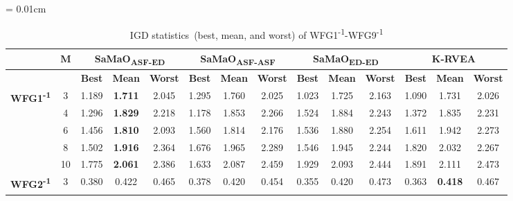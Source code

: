 \documentclass[onecolumn,10pt]{asme2ej}
\begin{document}
\begin{table}[!htb]\scriptsize
	\centering
	\caption{IGD statistics~(best, mean, and worst) of WFG1\textsuperscript{-1}-WFG9\textsuperscript{-1}}
	\label{tab:KHTTab:8}
	\tabcolsep = 0.01cm
	\begin{tabular}{|c|c|c|c|c|c|c|c|c|c|c|c|c|c|}
		\hline
		\textbf{}                                    & \textbf{M} & \multicolumn{3}{c|}{\textbf{SaMaO\textsubscript{ASF-ED}}}      & \multicolumn{3}{c|}{\textbf{SaMaO\textsubscript{ASF-ASF}}}      & \multicolumn{3}{c|}{\textbf{SaMaO\textsubscript{ED-ED}}}       & \multicolumn{3}{c|}{\textbf{K-RVEA}}            \\ \hline
		& \textbf{}  & \textbf{Best} & \textbf{Mean}  & \textbf{Worst} & \textbf{Best} & \textbf{Mean}   & \textbf{Worst} & \textbf{Best} & \textbf{Mean}  & \textbf{Worst} & \textbf{Best} & \textbf{Mean}  & \textbf{Worst} \\ \hline
		\multirow{5}{*}{\textbf{WFG1\textsuperscript{-1}}} & 3          & 1.189         & \textbf{1.711} & 2.045          & 1.295         & 1.760           & 2.025          & 1.023         & 1.725          & 2.163          & 1.090         & 1.731          & 2.026          \\ \cline{2-14} 
		& 4          & 1.296         & \textbf{1.829} & 2.218          & 1.178         & 1.853           & 2.266          & 1.524         & 1.884          & 2.243          & 1.372         & 1.835          & 2.231          \\ \cline{2-14} 
		& 6          & 1.456         & \textbf{1.810} & 2.093          & 1.560         & 1.814           & 2.176          & 1.536         & 1.880          & 2.254          & 1.611         & 1.942          & 2.273          \\ \cline{2-14} 
		& 8          & 1.502         & \textbf{1.916} & 2.364          & 1.676         & 1.965           & 2.289          & 1.546         & 1.945          & 2.244          & 1.820         & 2.032          & 2.267          \\ \cline{2-14} 
		& 10         & 1.775         & \textbf{2.061} & 2.386          & 1.633         & 2.087           & 2.459          & 1.929         & 2.093          & 2.444          & 1.891         & 2.111          & 2.473          \\ \hline
		\multirow{5}{*}{\textbf{WFG2\textsuperscript{-1}}} & 3          & 0.380         & 0.422          & 0.465          & 0.378         & 0.420           & 0.454          & 0.355         & 0.420          & 0.473          & 0.363         & \textbf{0.418} & 0.467          \\ \cline{2-14} 

\end{tabular}
\end{table}
\end{document}
